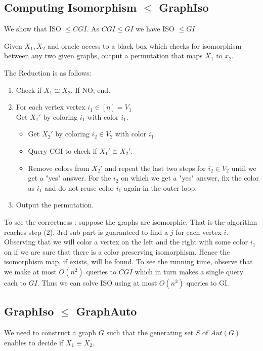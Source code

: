 \subsection{Computing Isomorphism $\le$ {\sc GraphIso}}

We show that {\sc ISO} $\le CGI$. As $CGI \leq GI$ we have {\sc ISO} $\le GI$. 

Given $X_1,X_2$ and oracle access to a black box which checks for isomorphism between any two given graphs, output a permutation that maps $X_1$ to $x_2$.

The Reduction is as follows:
\begin{enumerate}
\item Check if $X_1 \cong X_2$. If NO, end.
\item For each vertex vertex $i_1 \in [n] = V_1$ \\
	Get $X_1'$ by coloring $i_1$ with color $i_1$.
	\begin{itemize}
	\item Get $X_2'$ by coloring $i_2 \in V_2$ with color $i_1$.
	\item Query CGI to check if $X_1' \cong X_2'$.
	\item Remove colors from $X_2'$ and repeat the last two steps for $i_2 \in V_2$ until we get a "yes" answer. For the $i_2$ on which we get a "yes" answer, fix the color as $i_1$ and do not reuse color $i_1$ again in the outer loop.
	\end{itemize}
\item Output the permutation.
\end{enumerate}

To see the correctness : suppose the graphs are isomorphic. That is the algorithm reaches step (2), 3rd sub part is guaranteed to find a $j$ for each vertex $i$. Observing that we will color a vertex on the left and the right with some color $i_1$ on if we are sure that there is a color preserving isomorphism. Hence the isomorphism map, if exists, will be found.
To see the running time, observe that we make at most $O(n^2)$ queries to $CGI$ which in turn makes a single query each to $GI$. Thus we can solve {\sc ISO} using at most $O(n^2)$ queries to {\sc GI}.


\subsection{{\sc GraphIso} $\le$ {\sc GraphAuto}}

We need to construct a graph $G$ such that the generating set $S$ of $Aut(G)$ enables to decide if $X_1\equiv X_2$. 


